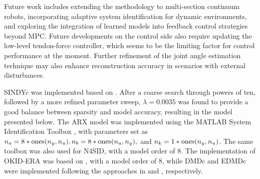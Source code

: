 \documentclass[../main.tex]{subfiles}
\begin{document}

Future work includes extending the methodology to multi-section continuum robots, incorporating adaptive system identification for dynamic environments, and exploring the integration of learned models into feedback control strategies beyond MPC. Future developments on the control side also require updating the low-level tendon-force controller, which seems to be the limiting factor for control performance at the moment. Further refinement of the joint angle estimation technique may also enhance reconstruction accuracy in scenarios with external disturbances.

\appendix
\label{app:implementation}

SINDYc was implemented based on \cite{brunton2017}. After a coarse search through powers of ten, followed by a more refined parameter sweep, $\lambda=0.0035$ was found to provide a good balance between sparsity and model accuracy, resulting in the model presented below. The ARX model was implemented using the MATLAB System Identification Toolbox \cite{MATLAB_SysID}, with parameters set as $n_a = 8 * {\rm ones}(n_y, n_u), n_b = 8 * {\rm ones}(n_u, n_y),$ and $ n_k = 1 * {\rm ones}(n_y, n_u) $. The same toolbox was also used for N4SID, with a model order of 8. The implementation of OKID-ERA was based on \cite{brunton2017}, with a model order of 8, while DMDc and EDMDc were implemented following the approaches in \cite{proctor2016} and \cite{williams2015}, respectively.
\end{document}
